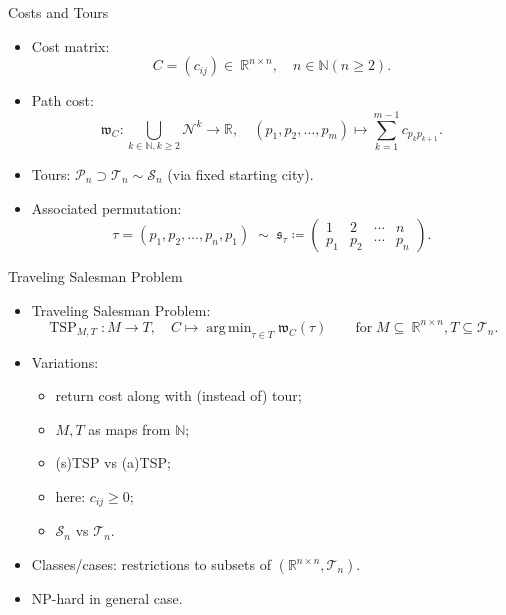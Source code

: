 \documentclass[
  size=10pt,
  style=klope,
  paper=screen,
  pauseslide,
  nopagebreaks,
  fleqn
]{powerdot}
\DeclareMathOperator*{\argmin}{arg\,min}
\def\eqitspace{\vspace{-5mm}}
\begin{document}
\begin{slide}[toc=]{Costs and Tours}
\begin{itemize}
  \item
  Cost matrix:
  \begin{equation}
    C = \left(c_{ij}\right) \in~\mathbb{R}^{n \times n},
    \quad n \in \mathbb{N} \left(n \geq 2\right).
  \end{equation}
  \eqitspace
  \item
  Path cost:
  \begin{equation}
    \mathfrak{w}_C: \bigcup_{k \in \mathbb{N}, k \geq 2}\mathcal{N}^k \to \mathbb{R}, \quad
    \left(p_1,p_2,\ldots,p_m\right) \mapsto \sum_{k=1}^{m-1} c_{p_k p_{k+1}}.
  \end{equation}
  \eqitspace
  \item
  Tours: $\mathcal{P}_n \supset \mathcal{T}_n \sim \mathcal{S}_n$ (via fixed starting city).
  \item
  Associated permutation:
  \begin{equation}
  \tau = \left(p_1, p_2, \ldots, p_n, p_1 \right)
  \; \sim \;
  \mathfrak{s}_\tau \coloneqq
  \begin{pmatrix}
    1 & 2 & \cdots & n \\
    p_1 & p_2 & \cdots &  p_n
  \end{pmatrix}.
  \end{equation}
\end{itemize}
\end{slide}

\begin{slide}{Traveling Salesman Problem}
\begin{itemize}
  \item
  Traveling Salesman Problem:
  \begin{equation}
    \operatorname{TSP}_{M,T}: M \to T, \quad
    C \mapsto \argmin_{\tau \in T} \mathfrak{w}_C\left(\tau\right)
    \qquad \text{for} \; M \subseteq~\mathbb{R}^{n \times n}, T \subseteq \mathcal{T}_n.
  \end{equation}
  \eqitspace
  \item
  Variations:
  \begin{itemize}
  \item return cost along with (instead of) tour;
  \item $M, T$ as maps from $\mathbb{N}$;
  \item (s)TSP vs (a)TSP;
  \item here: $c_{ij} \geq 0$;
  \item $\mathcal{S}_n$ vs $\mathcal{T}_n$.
  \end{itemize}
  \item
  Classes/cases: restrictions to subsets of $(\mathbb{R}^{n \times n}, \mathcal{T}_n)$.
  \item
  NP-hard in general case.
\end{itemize}
\end{slide}
\end{document}
